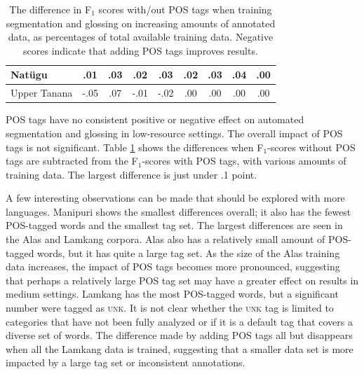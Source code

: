 \begin{table}[b]
\begin{tabular}{l|cccccccc}
       Nat\"ugu & .01 & .03 & .02 & .03 & .02 & .03 & .04 & .00 \\
       \hline
       Upper Tanana & -.05 & .07 & -.01 & -.02 & .00 & .00 & .00 & .00 \\
    \end{tabular}
    \caption[Segmenting and Glossing with/out POS tags]{The difference in F$_1$ scores with/out POS tags when training segmentation and glossing on increasing amounts of annotated data, as percentages of total available training data. Negative scores indicate that adding POS tags improves results.
    }
    \label{tab:POSSG}
\end{table}

POS tags have no consistent positive or negative effect on automated segmentation and glossing in low-resource settings. The overall impact of POS tags is not significant. Table \ref{tab:POSSG} shows the differences when F$_1$-scores without POS tags are subtracted from the F$_1$-scores with POS tags, with various amounts of training data. The largest difference is just under .1 point. 

A few interesting observations can be made that should be explored with more languages. Manipuri shows the smallest differences overall; it also has the fewest POS-tagged words and the smallest tag set. The largest differences are seen in the Alas and Lamkang corpora. Alas also has a relatively small amount of POS-tagged words, but it has quite a large tag set. As the size of the Alas training data increases, the impact of POS tags becomes more pronounced, suggesting that perhaps a relatively large POS tag set may have a greater effect on results in medium settings. Lamkang has the most POS-tagged words, but a significant number were tagged as \textsc{unk}. It is not clear whether the \textsc{unk} tag is limited to categories that have not been fully analyzed or if it is a default tag that covers a diverse set of words. The difference made by adding POS tags all but disappears when all the Lamkang data is trained, suggesting that a smaller data set is more impacted by a large tag set or inconsistent annotations.


